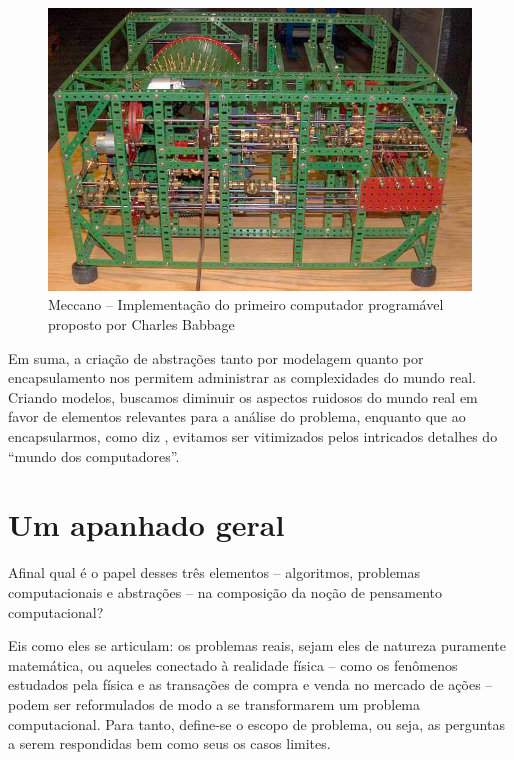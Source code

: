 \begin{figure}[!htb]
	\caption{Meccano -- Implementação do primeiro computador programável proposto por Charles Babbage }\label{fig:meccano}
	\begin{center}
		\includegraphics[scale=0.45]{imagens/babbage}
	\end{center}
\end{figure}

Em suma, a criação de abstrações tanto por modelagem quanto por encapsulamento nos permitem administrar as complexidades do mundo real. Criando modelos, buscamos diminuir os aspectos ruidosos do mundo real em favor de elementos relevantes para a análise do problema, enquanto que ao encapsularmos, como diz , evitamos ser vitimizados pelos intricados detalhes do ``mundo dos computadores''.

\section{Um apanhado geral}



Afinal qual é o papel desses três elementos -- algoritmos, problemas computacionais e abstrações -- na composição da noção de pensamento computacional?

Eis como eles se articulam: os problemas reais, sejam eles de natureza puramente matemática, ou aqueles conectado à realidade física -- como os fenômenos estudados pela física e as transações de compra e venda no mercado de ações -- podem ser reformulados de modo a se transformarem um problema computacional. Para tanto, define-se o escopo de problema, ou seja, as perguntas a serem respondidas bem como seus os casos limites. 

